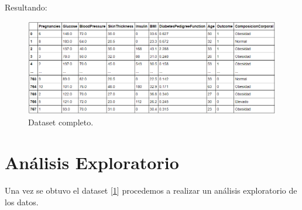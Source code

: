 \documentclass{article}
\begin{document}
Resultando:

\begin{figure}[H]
	\centering
	\includegraphics[width=0.9\linewidth]{dataset_completo.png}
	\caption{Dataset completo.}%
	\label{fig:dataset_completo}
\end{figure}


\section{Análisis Exploratorio}

Una vez se obtuvo el dataset [\ref{fig:dataset_completo}] procedemos a realizar un análisis exploratorio de los datos.


\onecolumn{
  
  
}
\end{document}
